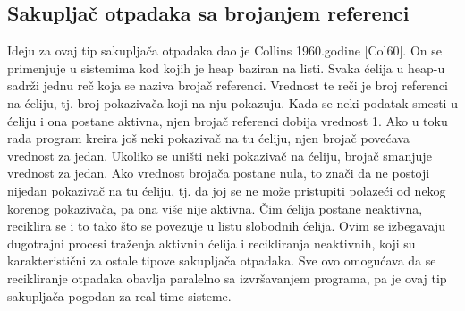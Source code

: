 \subsection{Sakupljač otpadaka sa brojanjem referenci}
\label{ref:reference counter}

Ideju za ovaj tip sakupljača otpadaka dao je Collins 1960.godine [Col60]. On se primenjuje u sistemima kod kojih je heap baziran na listi. Svaka ćelija u heap-u sadrži jednu reč koja se naziva brojač referenci. Vrednost te reči je broj referenci na ćeliju, tj. broj pokazivača koji na nju pokazuju. Kada se neki podatak smesti u ćeliju i ona postane aktivna, njen brojač referenci dobija vrednost 1. Ako u toku rada program kreira još neki pokazivač na tu ćeliju, njen brojač povećava vrednost za jedan. Ukoliko se uništi neki pokazivač na ćeliju, brojač smanjuje vrednost za jedan. Ako vrednost brojača postane nula, to znači da ne postoji nijedan pokazivač na tu ćeliju, tj. da joj se ne može pristupiti polazeći od nekog korenog pokazivača, pa ona više nije aktivna. Čim ćelija postane neaktivna, reciklira se i to tako što se povezuje u listu slobodnih ćelija. Ovim se izbegavaju dugotrajni procesi traženja aktivnih ćelija i recikliranja neaktivnih, koji su karakteristični za ostale tipove sakupljača otpadaka. Sve ovo omogućava da se recikliranje otpadaka obavlja paralelno sa izvršavanjem programa, pa je ovaj tip sakupljača pogodan za real-time sisteme.
